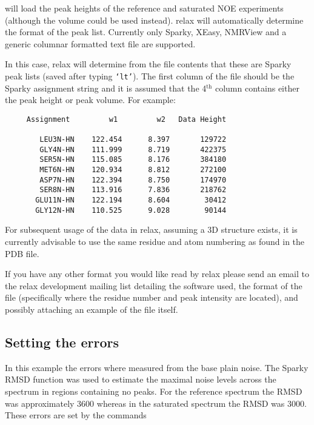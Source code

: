 will load the peak heights of the reference and saturated NOE experiments (although the volume could be used instead).  relax will automatically determine the format of the peak list.  Currently only Sparky, XEasy, NMRView and a generic columnar formatted text file are supported.

In this case, relax will determine from the file contents that these are Sparky peak lists (saved after typing \texttt{`lt'}).  The first column of the file should be the Sparky assignment string and it is assumed that the 4$^\textrm{th}$ column contains either the peak height or peak volume.  For example:

{\footnotesize \begin{verbatim}
     Assignment         w1         w2   Data Height

        LEU3N-HN    122.454      8.397       129722
        GLY4N-HN    111.999      8.719       422375
        SER5N-HN    115.085      8.176       384180
        MET6N-HN    120.934      8.812       272100
        ASP7N-HN    122.394      8.750       174970
        SER8N-HN    113.916      7.836       218762
       GLU11N-HN    122.194      8.604        30412
       GLY12N-HN    110.525      9.028        90144
\end{verbatim}}

For subsequent usage of the data in relax, assuming a 3D structure exists, it is currently advisable to use the same residue and atom numbering as found in the PDB file.

If you have any other format you would like read by relax please send an email to the relax development mailing list detailing the software used, the format of the file (specifically where the residue number and peak intensity are located), and possibly attaching an example of the file itself.




\subsection{Setting the errors}

In this example the errors where measured from the base plain noise.  The Sparky RMSD function was used to estimate the maximal noise levels across the spectrum in regions containing no peaks.  For the reference spectrum the RMSD was approximately 3600 whereas in the saturated spectrum the RMSD was 3000.  These errors are set by the commands

